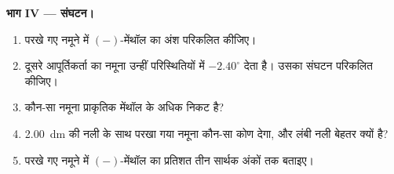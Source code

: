 \begin{problem}
\medskip
\noindent\textbf{भाग IV --- संघटन।}
\begin{enumerate}[resume]
  \item परखे गए नमूने में $(-)$-मेंथॉल का अंश परिकलित कीजिए।
  \item दूसरे आपूर्तिकर्ता का नमूना उन्हीं परिस्थितियों में $-2.40^\circ$ देता है।
        उसका संघटन परिकलित कीजिए।
  \item कौन-सा नमूना प्राकृतिक मेंथॉल के अधिक निकट है?
  \item \qty{2.00}{dm} की नली के साथ परखा गया नमूना कौन-सा कोण
        देगा, और लंबी नली बेहतर क्यों है?
  \item परखे गए नमूने में $(-)$-मेंथॉल का प्रतिशत तीन सार्थक अंकों तक
        बताइए।
\end{enumerate}
\end{problem}
